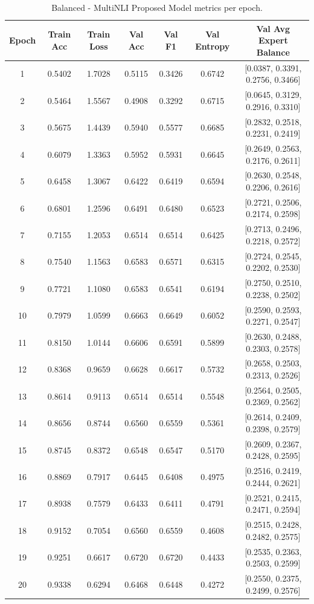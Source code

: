 \documentclass{article}
\begin{document}
\begin{table}[h]
\centering
\small
\setlength{\tabcolsep}{4pt}
\begin{tabular}{c c c c c c c}
\hline
\textbf{Epoch} & \textbf{Train Acc} & \textbf{Train Loss} & \textbf{Val Acc} & \textbf{Val F1} & \textbf{Val Entropy} & \textbf{Val Avg Expert Balance} \\
\hline
1  & 0.5402 & 1.7028 & 0.5115 & 0.3426 & 0.6742 & [0.0387, 0.3391, 0.2756, 0.3466] \\
2  & 0.5464 & 1.5567 & 0.4908 & 0.3292 & 0.6715 & [0.0645, 0.3129, 0.2916, 0.3310] \\
3  & 0.5675 & 1.4439 & 0.5940 & 0.5577 & 0.6685 & [0.2832, 0.2518, 0.2231, 0.2419] \\
4  & 0.6079 & 1.3363 & 0.5952 & 0.5931 & 0.6645 & [0.2649, 0.2563, 0.2176, 0.2611] \\
5  & 0.6458 & 1.3067 & 0.6422 & 0.6419 & 0.6594 & [0.2630, 0.2548, 0.2206, 0.2616] \\
6  & 0.6801 & 1.2596 & 0.6491 & 0.6480 & 0.6523 & [0.2721, 0.2506, 0.2174, 0.2598] \\
7  & 0.7155 & 1.2053 & 0.6514 & 0.6514 & 0.6425 & [0.2713, 0.2496, 0.2218, 0.2572] \\
8  & 0.7540 & 1.1563 & 0.6583 & 0.6571 & 0.6315 & [0.2724, 0.2545, 0.2202, 0.2530] \\
9  & 0.7721 & 1.1080 & 0.6583 & 0.6541 & 0.6194 & [0.2750, 0.2510, 0.2238, 0.2502] \\
10 & 0.7979 & 1.0599 & 0.6663 & 0.6649 & 0.6052 & [0.2590, 0.2593, 0.2271, 0.2547] \\
11 & 0.8150 & 1.0144 & 0.6606 & 0.6591 & 0.5899 & [0.2630, 0.2488, 0.2303, 0.2578] \\
12 & 0.8368 & 0.9659 & 0.6628 & 0.6617 & 0.5732 & [0.2658, 0.2503, 0.2313, 0.2526] \\
13 & 0.8614 & 0.9113 & 0.6514 & 0.6514 & 0.5548 & [0.2564, 0.2505, 0.2369, 0.2562] \\
14 & 0.8656 & 0.8744 & 0.6560 & 0.6559 & 0.5361 & [0.2614, 0.2409, 0.2398, 0.2579] \\
15 & 0.8745 & 0.8372 & 0.6548 & 0.6547 & 0.5170 & [0.2609, 0.2367, 0.2428, 0.2595] \\
16 & 0.8869 & 0.7917 & 0.6445 & 0.6408 & 0.4975 & [0.2516, 0.2419, 0.2444, 0.2621] \\
17 & 0.8938 & 0.7579 & 0.6433 & 0.6411 & 0.4791 & [0.2521, 0.2415, 0.2471, 0.2594] \\
18 & 0.9152 & 0.7054 & 0.6560 & 0.6559 & 0.4608 & [0.2515, 0.2428, 0.2482, 0.2575] \\
19 & 0.9251 & 0.6617 & 0.6720 & 0.6720 & 0.4433 & [0.2535, 0.2363, 0.2503, 0.2599] \\
20 & 0.9338 & 0.6294 & 0.6468 & 0.6448 & 0.4272 & [0.2550, 0.2375, 0.2499, 0.2576] \\
\hline
\end{tabular}
\caption{Balanced - MultiNLI Proposed Model metrics per epoch.}
\label{tab:metrics2}
\end{table}
\end{document}
